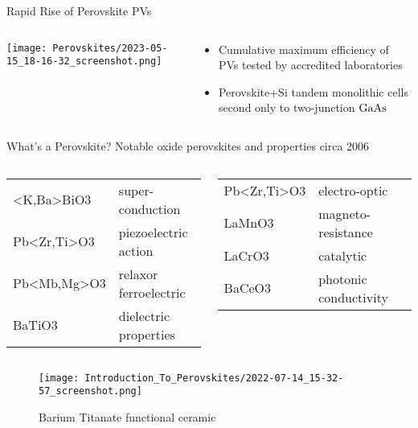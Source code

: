 \documentclass[10pt, aspectratio=169, presentation]{beamer}
\begin{document}
\begin{frame}[label={sec:orgcdf8b37}]{Rapid Rise of Perovskite PVs}
\begin{columns}
\begin{column}{0.6\columnwidth}
\begin{center}
\texttt{[image: Perovskites/2023-05-15\_18-16-32\_screenshot.png]}
\end{center}
\end{column}

\begin{column}{0.4\columnwidth}
\begin{itemize}
\item Cumulative maximum efficiency of PVs tested by accredited laboratories\autocite{research-2023-best-resear}
\item Perovskite+Si tandem monolithic cells second only to two-junction \(\ce{GaAs}\)
\end{itemize}
\end{column}
\end{columns}
\end{frame}

\begin{frame}[label={sec:orgaa0f698}]{What's a Perovskite?}
Notable oxide perovskites and properties circa 2006
\autocite{jiang-2006-predic-lattic}
\begin{columns}
\begin{column}{0.5\columnwidth}
\small
\begin{center}
\begin{tabular}{ll}
<K,Ba>BiO3 & super-conduction\\[0pt]
Pb<Zr,Ti>O3 & piezoelectric action\\[0pt]
Pb<Mb,Mg>O3 & relaxor ferroelectric\\[0pt]
BaTiO3 & dielectric properties\\[0pt]
\end{tabular}
\end{center}
\end{column}
\begin{column}{0.5\columnwidth}
\small
\begin{center}
\begin{tabular}{ll}
Pb<Zr,Ti>O3 & electro-optic\\[0pt]
LaMnO3 & magneto-resistance\\[0pt]
LaCrO3 & catalytic\\[0pt]
BaCeO3 & photonic conductivity\\[0pt]
\end{tabular}
\end{center}
\end{column}
\end{columns}
\begin{figure}[htbp]
\centering
\texttt{[image: Introduction\_To\_Perovskites/2022-07-14\_15-32-57\_screenshot.png]}
\caption{Barium Titanate functional ceramic}
\end{figure}
\end{frame}
\end{document}
